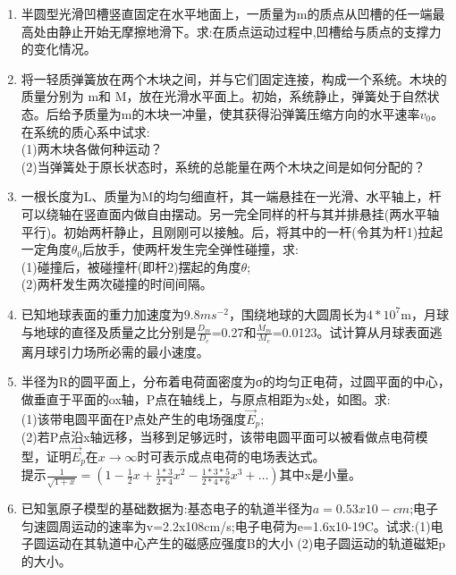 \begin{enumerate}
\item 半圆型光滑凹槽竖直固定在水平地面上，一质量为m的质点从凹槽的任一端最高处由静止开始无摩擦地滑下。求:在质点运动过程中,凹槽给与质点的支撑力的变化情况。
\item 将一轻质弹簧放在两个木块之间，并与它们固定连接，构成一个系统。木块的质量分别为 m和 M，放在光滑水平面上。初始，系统静止，弹簧处于自然状态。后给予质量为m的木块一冲量，使其获得沿弹簧压缩方向的水平速率$v_0$。在系统的质心系中试求:\\
(1)两木块各做何种运动？\\
(2)当弹簧处于原长状态时，系统的总能量在两个木块之间是如何分配的？
\item 一根长度为L、质量为M的均匀细直杆，其一端悬挂在一光滑、水平轴上，杆可以绕轴在竖直面内做自由摆动。另一完全同样的杆与其并排悬挂(两水平轴平行)。初始两杆静止，且刚刚可以接触。后，将其中的一杆(令其为杆1)拉起一定角度$\theta_0$后放手，使两杆发生完全弹性碰撞，求:\\
(1)碰撞后，被碰撞杆(即杆2)摆起的角度$\theta$;\\
(2)两杆发生两次碰撞的时间间隔。
\item 已知地球表面的重力加速度为$9.8ms^{-2}$，围绕地球的大圆周长为$4*10^7$m，月球与地球的直径及质量之比分别是$\frac{D_m}{D_e}$=0.27和$\frac{M_m}{M_e}$=0.0123。试计算从月球表面逃离月球引力场所必需的最小速度。
\item 半径为R的圆平面上，分布着电荷面密度为σ的均匀正电荷，过圆平面的中心，做垂直于平面的ox轴，P点在轴线上，与原点相距为x处，如图。求:\\
(1)该带电圆平面在P点处产生的电场强度$\vec E_p$;\\
(2)若P点沿x轴远移，当移到足够远时，该带电圆平面可以被看做点电荷模型，证明$\vec E_p$在$x \to \infty$时可表示成点电荷的电场表达式。\\
提示$\displaystyle \frac{1}{\sqrt{1+x}}=(1-\frac{1}{2}x+\frac{1*3}{2*4}x^2-\frac{1*3*5}{2*4*6}x^3+\dots)$其中x是小量。
\item 已知氢原子模型的基础数据为:基态电子的轨道半径为$a=0.53x10-cm$;电子匀速圆周运动的速率为v=2.2x108cm/s;电子电荷为e=1.6x10-19C。试求:(1)电子圆运动在其轨道中心产生的磁感应强度B的大小
(2)电子圆运动的轨道磁矩p 的大小。
\end{enumerate}
